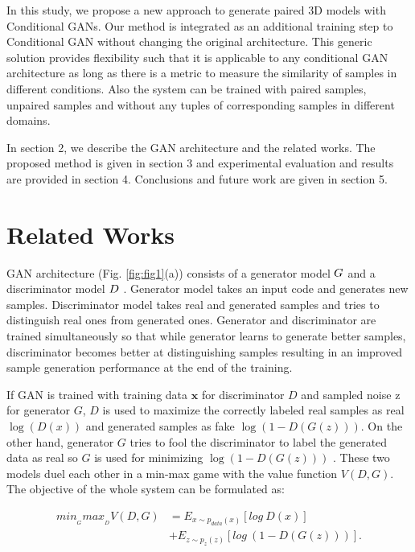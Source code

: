 \documentclass[runningheads]{llncs}
\begin{document}
In this study, we propose a new approach to generate paired 3D models with Conditional GANs. Our method is integrated as an additional training step to Conditional GAN without changing the original architecture. This generic solution provides flexibility such that it is applicable to any conditional GAN architecture as long as there is a metric to measure the similarity of samples in different conditions. Also the system can be trained with paired samples, unpaired samples and without any tuples of corresponding samples in different domains.
	 
In section 2, we describe the GAN architecture and the related works. The proposed method is given in section 3 and experimental evaluation and results are provided in section 4. Conclusions and future work are given in section 5.

\section{Related Works}
\label{sect:relatedworks} GAN architecture (Fig. \ref{fig:fig1}(a)) consists of a generator model $\mathnormal{G}$ and a discriminator model $\mathnormal{D}$ \cite{goodfellow2014generative}. Generator model takes an input code and generates new samples. Discriminator model takes real and generated samples and tries to distinguish real ones from generated ones. Generator and discriminator are trained simultaneously so that while generator learns to generate better samples, discriminator becomes better at distinguishing samples resulting in an improved sample generation performance at the end of the training.

	If GAN is trained with training data $\mathbf{x}$ for discriminator $D$ and sampled noise z for generator $G$, $D$ is used to maximize the correctly labeled real samples as real $\log(D(x))$ and generated samples as fake $\log(1 - D(G(z)))$. On the other hand, generator $G$ tries to fool the discriminator to label the generated data as real so $G$ is used for minimizing $\log(1 - D(G(z)))$ . These two models duel each other in a min-max game with the value function $V(D,G)$. The objective of the whole system can be formulated as: 

\begin{equation}
\begin{split}
min_{_{G}}max_{_{D}}V(D,G) &= E_{x\sim p_{data}(x)}[log~D(x)]\\
&+  E_{z\sim p_{z}(z)}[log~ (1-D(G(z)))].
\end{split}
\end{equation}
\end{document}
